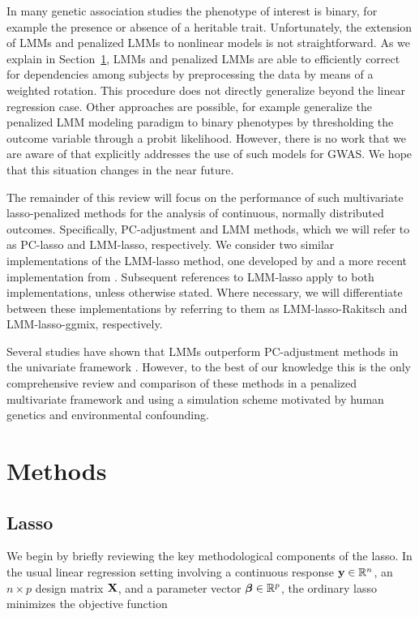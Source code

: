 In many genetic association studies the phenotype of interest is binary, for example the presence or absence of a heritable trait. Unfortunately, the extension of LMMs and penalized LMMs to nonlinear models is not straightforward. As we explain in Section~\ref{sec:methods_paper1}, LMMs and penalized LMMs are able to efficiently correct for dependencies among subjects by preprocessing the data by means of a weighted rotation. This procedure does not directly generalize beyond the linear regression case. Other approaches are possible, for example \citet{mandt2017sparse} generalize the penalized LMM modeling paradigm to binary phenotypes by thresholding the outcome variable through a probit likelihood. However, there is no work that we are aware of that explicitly addresses the use of such models for GWAS. We hope that this situation changes in the near future.

The remainder of this review will focus on the performance of such multivariate lasso-penalized methods for the analysis of continuous, normally distributed outcomes. Specifically, PC-adjustment and LMM methods, which we will refer to as PC-lasso and LMM-lasso, respectively. We consider two similar implementations of the LMM-lasso method, one developed by \citet{rakitsch2013lasso} and a more recent implementation from \citet{bhatnagar2020simultaneous}. Subsequent references to LMM-lasso apply to both implementations, unless otherwise stated. Where necessary, we will differentiate between these implementations by referring to them as LMM-lasso-Rakitsch and LMM-lasso-ggmix, respectively. 

Several studies have shown that LMMs outperform PC-adjustment methods in the univariate framework \citep{wang2013analytical, kang2010variance, zhao2007arabidopsis}. However, to the best of our knowledge this is the only comprehensive review and comparison of these methods in a penalized multivariate framework and using a simulation scheme motivated by human genetics and environmental confounding.\\

\section{Methods} \label{sec:methods_paper1}
\subsection{Lasso}
We begin by briefly reviewing the key methodological components of the lasso. In the usual linear regression setting involving a continuous response $\mathbf{y} \in \mathbb{R}^n$, an $n \times p$ design matrix $\mathbf{X}$, and a parameter vector $\boldsymbol{\beta}{} \in \mathbb{R}^p$, the ordinary lasso minimizes the objective function

